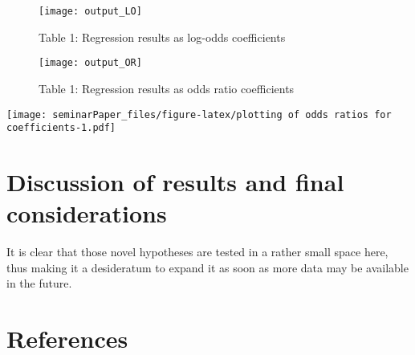 \documentclass[
  12pt,
  english,
]{article}
\begin{document}
\begin{figure}

{\centering \texttt{[image: output\_LO]} 

}

\caption{Table 1: Regression results as log-odds coefficients}\label{fig:insert graphics: LO table}
\end{figure}

\begin{figure}

{\centering \texttt{[image: output\_OR]} 

}

\caption{Table 1: Regression results as odds ratio coefficients}\label{fig:insert graphics: OR table}
\end{figure}

\texttt{[image: seminarPaper\_files/figure-latex/plotting of odds ratios for coefficients-1.pdf]}

\hypertarget{discussion-of-results-and-final-considerations}{%
\section{Discussion of results and final
considerations}\label{discussion-of-results-and-final-considerations}}

It is clear that those novel hypotheses are tested in a rather small
space here, thus making it a desideratum to expand it as soon as more
data may be available in the future.

\newpage{}

\hypertarget{references}{%
\section{References}\label{references}}
\end{document}

